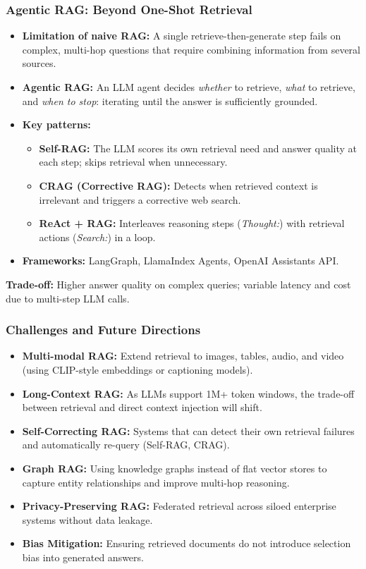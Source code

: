 \begin{frame}[fragile]\frametitle{Agentic RAG: Beyond One-Shot Retrieval}
\begin{itemize}
  \item \textbf{Limitation of naive RAG:} A single retrieve-then-generate step fails on complex, multi-hop questions that require combining information from several sources.
  \item \textbf{Agentic RAG:} An LLM agent decides \textit{whether} to retrieve, \textit{what} to retrieve, and \textit{when to stop}: iterating until the answer is sufficiently grounded.
  \item \textbf{Key patterns:}
    \begin{itemize}
      \item \textbf{Self-RAG:} The LLM scores its own retrieval need and answer quality at each step; skips retrieval when unnecessary.
      \item \textbf{CRAG (Corrective RAG):} Detects when retrieved context is irrelevant and triggers a corrective web search.
      \item \textbf{ReAct + RAG:} Interleaves reasoning steps (\textit{Thought:}) with retrieval actions (\textit{Search:}) in a loop.
    \end{itemize}
  \item \textbf{Frameworks:} LangGraph, LlamaIndex Agents, OpenAI Assistants API.
\end{itemize}
\vspace{0.2em}
{\small \textbf{Trade-off:} Higher answer quality on complex queries; variable latency and cost due to multi-step LLM calls.}
\end{frame}

\begin{frame}[fragile]\frametitle{Challenges and Future Directions}

\begin{itemize}
\item \textbf{Multi-modal RAG:} Extend retrieval to images, tables, audio, and video (using CLIP-style embeddings or captioning models).
\item \textbf{Long-Context RAG:} As LLMs support 1M+ token windows, the trade-off between retrieval and direct context injection will shift.
\item \textbf{Self-Correcting RAG:} Systems that can detect their own retrieval failures and automatically re-query (Self-RAG, CRAG).
\item \textbf{Graph RAG:} Using knowledge graphs instead of flat vector stores to capture entity relationships and improve multi-hop reasoning.
\item \textbf{Privacy-Preserving RAG:} Federated retrieval across siloed enterprise systems without data leakage.
\item \textbf{Bias Mitigation:} Ensuring retrieved documents do not introduce selection bias into generated answers.
\end{itemize}

\end{frame}
